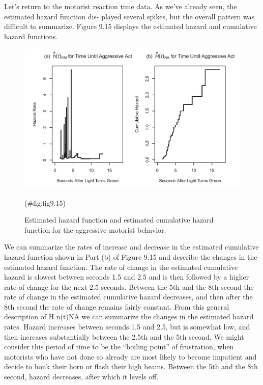 \documentclass[
]{report}
\begin{document}
Let's return to the motorist reaction time data. As we've already seen, the estimated hazard function dis-
played several spikes, but the overall pattern was difficult to summarize. Figure 9.15 displays the estimated
hazard and cumulative hazard functions.

\begin{figure}

{\centering \includegraphics[width=1\linewidth]{docs/Fig9_15} 

}

\caption{Estimated hazard function and estimated cumulative hazard function for the aggressive motorist behavior.}(\#fig:fig9.15)
\end{figure}

We can summarize the rates of increase and decrease in the estimated cumulative hazard function
shown in Part (b) of Figure 9.15 and describe the changes in the estimated hazard function. The rate of
change in the estimated cumulative hazard is slowest between seconds 1.5 and 2.5 and is then followed by
a higher rate of change for the next 2.5 seconds. Between the 5th and the 8th second the rate of change in
the estimated cumulative hazard decreases, and then after the 8th second the rate of change remains fairly
constant. From this general description of H n(t)NA we can summarize the changes in the estimated hazard
rates. Hazard increases between seconds 1.5 and 2.5, but is somewhat low, and then increases substantially
between the 2.5th and the 5th second. We might consider this period of time to be the ``boiling point'' of
frustration, when motorists who have not done so already are most likely to become impatient and decide
to honk their horn or flash their high beams. Between the 5th and the 8th second, hazard decreases, after
which it levels off.
\end{document}
